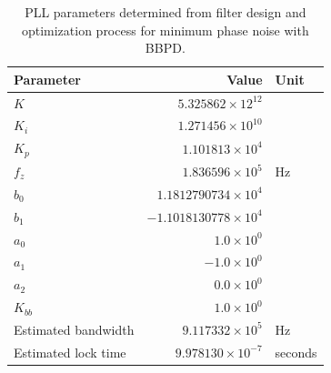 \begin{table}[h!]
	\centering
	\def\arraystretch{1.5}		
	\setlength\arrayrulewidth{0.75pt}
	\setlength{\tabcolsep}{1em} %
	\begin{tabular}{|l|r|l|}
		\hline 
		\rule[-1ex]{0pt}{2.5ex} \cellcolor{gray!40}\textbf{Parameter} & \cellcolor{gray!40}\textbf{Value} & \cellcolor{gray!40}\textbf{Unit }\\ 
		\hline 
		\rule[-1ex]{0pt}{2.5ex} \textbf{$K$}  & $5.325862\times12^{12}$ &  \\
		\hline 
		\rule[-1ex]{0pt}{2.5ex} \textbf{$K_i$}  & $1.271456\times10^{10}$ &  \\
		\hline 
		\rule[-1ex]{0pt}{2.5ex} \textbf{$K_p$}  & $1.101813\times10^{4}$ &  \\
		\hline 
		\rule[-1ex]{0pt}{2.5ex} \textbf{$f_z$} & $1.836596\times10^5$ & Hz\\
		\hline 
		\rule[-1ex]{0pt}{2.5ex} \textbf{$b_0$}  & $1.1812790734\times10^4$  &\\
		\hline 
		\rule[-1ex]{0pt}{2.5ex} \textbf{$b_1$}  & $-1.1018130778\times10^4$  & \\
		\hline 
		\rule[-1ex]{0pt}{2.5ex} \textbf{$a_0$}  & $1.0\times10^0$  &\\ 
		\hline 
		\rule[-1ex]{0pt}{2.5ex} \textbf{$a_1$}  & $-1.0\times10^0$  & \\ 
		\hline 
		\rule[-1ex]{0pt}{2.5ex} \textbf{$a_2$}  & $0.0\times10^0$  & \\ 
		\hline 
		\rule[-1ex]{0pt}{2.5ex} \textbf{$K_{bb}$}  & $1.0\times10^0$  & \\ 
		\hline 
		\rule[-1ex]{0pt}{2.5ex} Estimated bandwidth & $9.117332\times10^5$ & Hz \\
		\hline 
		\rule[-1ex]{0pt}{2.5ex} Estimated lock time & $9.978130\times10^{-7}$ & seconds \\
		\hline 
	\end{tabular} 
	\caption{PLL parameters determined from filter design and optimization process for minimum phase noise with BBPD.}
	\label{filter_params_bbpd_low_noise}
\end{table}   

